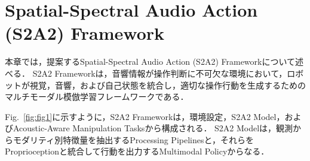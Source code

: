 \documentclass{article}
\begin{document}








\section{Spatial-Spectral Audio Action (S2A2) Framework}
\label{sec:s2a2_framework}
	本章では，提案するSpatial-Spectral Audio Action (S2A2) Frameworkについて述べる．
	S2A2 Frameworkは，音響情報が操作判断に不可欠な環境において，ロボットが視覚，音響，および自己状態を統合し，適切な操作行動を生成するためのマルチモーダル模倣学習フレームワークである．

	Fig.~\ref{fig:fig1}に示すように，S2A2 Frameworkは，環境設定，S2A2 Model，およびAcoustic-Aware Manipulation Tasksから構成される．
	S2A2 Modelは，観測からモダリティ別特徴量を抽出するProcessing Pipelinesと，それらをProprioceptionと統合して行動を出力するMultimodal Policyからなる．
	
\end{document}
